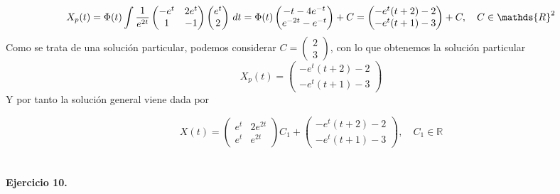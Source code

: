 \documentclass[fleqn]{article}
\def\R{\mathds{R}}
\begin{document}
    $$X_p(t) = \Phi(t) \int 
    \frac{1}{e^{2t}}
    \begin{pmatrix}
        -e^t & 2e^t\\
        1 & -1
    \end{pmatrix}
    \begin{pmatrix}
        e^t \\ 2
    \end{pmatrix}
    \thinspace dt = \Phi(t)
    \begin{pmatrix}
        -t - 4e^{-t}\\
        e^{-2t} - e^{-t}
    \end{pmatrix}
    +C = 
    \begin{pmatrix}
        -e^t(t+2) -2\\
        -e^t(t+1) -3
    \end{pmatrix}
    +C, \quad C \in \R^2
    $$
    Como se trata de una solución particular, podemos considerar $C=\begin{pmatrix} 2 \\ 3\end{pmatrix}$, con lo que obtenemos la solución particular
    $$X_p(t)=
    \begin{pmatrix}
        -e^t(t+2) -2\\
        -e^t(t+1) -3
    \end{pmatrix}$$
    Y por tanto la solución general viene dada por 

    $$X(t)= 
    \begin{pmatrix}
        e^t & 2e^{2t}\\
        e^t & e^{2t}
    \end{pmatrix}
    C_1 + 
    \begin{pmatrix}
        -e^t(t+2) -2\\
        -e^t(t+1) -3
    \end{pmatrix}, \quad C_1\in\R
    $$\\ \\

    \textbf{Ejercicio 10. } \\

    
\end{document}

